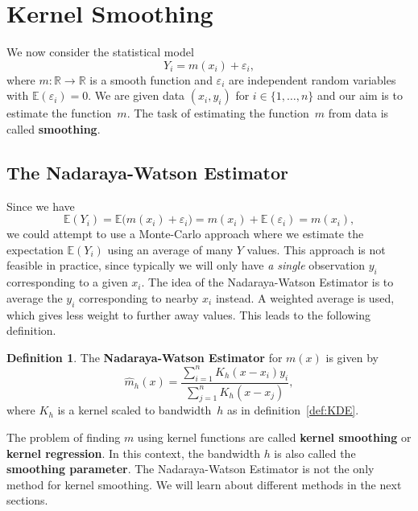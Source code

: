 \documentclass[
  a4paper,
]{article}
\theoremstyle{definition}
\newtheorem{definition}{Definition}[section]
\theoremstyle{definition}
\theoremstyle{definition}
\theoremstyle{definition}
\theoremstyle{remark}
\begin{document}
\clearpage

\section{Kernel Smoothing}\label{X05-smoothing}

We now consider the statistical model
\begin{equation*}
  Y_i
  = m(x_i) + \varepsilon_i,
\end{equation*}
where \(m\colon \mathbb{R}\to \mathbb{R}\) is a smooth function and \(\varepsilon_i\) are independent
random variables with \(\mathbb{E}(\varepsilon_i) = 0\). We are given data \((x_i, y_i)\) for
\(i\in \{1, \ldots, n\}\) and our aim is to estimate the function~\(m\). The
task of estimating the function~\(m\) from data is called \textbf{smoothing}.

\subsection{The Nadaraya-Watson Estimator}\label{the-nadaraya-watson-estimator}

Since we have
\begin{equation*}
  \mathbb{E}(Y_i)
  = \mathbb{E}\bigl( m(x_i) + \varepsilon_i \bigr)
  = m(x_i) + \mathbb{E}( \varepsilon_i )
  = m(x_i),
\end{equation*}
we could attempt to use a Monte-Carlo approach where we estimate the
expectation \(\mathbb{E}(Y_i)\) using an average of many \(Y\) values. This approach is
not feasible in practice, since typically we will only have \emph{a single}
observation \(y_i\) corresponding to a given \(x_i\). The idea of the
Nadaraya-Watson Estimator is to average the \(y_i\) corresponding to nearby \(x_i\)
instead. A weighted average is used, which gives less weight to further away
values. This leads to the following definition.

\begin{definition}
\protect\hypertarget{def:NW}{}\label{def:NW}The \textbf{Nadaraya-Watson Estimator} for \(m(x)\) is given by
\begin{equation*}
  \hat m_h(x)
  = \frac{\sum_{i=1}^n K_h(x - x_i) y_i}{\sum_{j=1}^n K_h(x - x_j)},
\end{equation*}
where \(K_h\) is a kernel scaled to bandwidth~\(h\) as in
definition~\ref{def:KDE}.
\end{definition}

The problem of finding \(m\) using kernel functions are called \textbf{kernel smoothing}
or \textbf{kernel regression}. In this context, the bandwidth \(h\) is also called
the \textbf{smoothing parameter}. The Nadaraya-Watson Estimator is not the only
method for kernel smoothing. We will learn about different methods in the
next sections.
\end{document}
